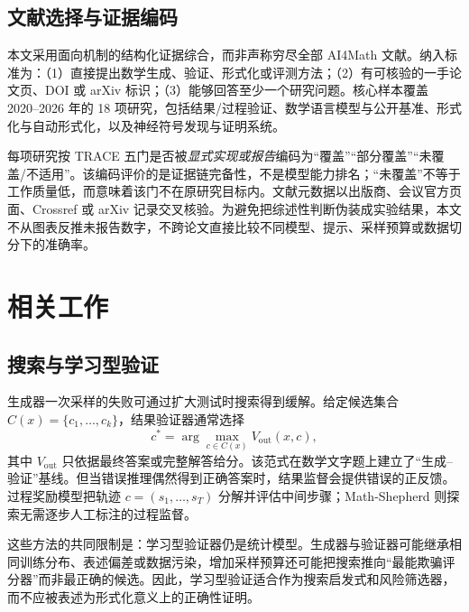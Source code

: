 \documentclass[UTF8,11pt,a4paper,fontset=fandol]{ctexart}
\newcommand{\trace}{\textsf{TRACE}}
\begin{document}
\subsection{文献选择与证据编码}
本文采用面向机制的结构化证据综合，而非声称穷尽全部 AI4Math 文献。纳入标准为：（1）直接提出数学生成、验证、形式化或评测方法；（2）有可核验的一手论文页、DOI 或 arXiv 标识；（3）能够回答至少一个研究问题。核心样本覆盖 2020--2026 年的 18 项研究，包括结果/过程验证\cite{cobbe2021verifiers,uesato2022feedback,lightman2024verify,wang2024mathshepherd}、数学语言模型与公开基准\cite{lewkowycz2022minerva,hendrycks2021math,he2024olympiadbench,glazer2024frontiermath}、形式化与自动形式化\cite{demoura2021lean4,mathlib2020,zheng2022minif2f,wu2022autoformalization,jiang2023draft,azerbayev2023proofnet,yang2023leandojo,poesia2023peano}，以及神经符号发现与证明系统\cite{trinh2024alphageometry,romeraparedes2024funsearch,hubert2026alphaproof}。

每项研究按 \trace{} 五门是否被\emph{显式实现或报告}编码为“覆盖”“部分覆盖”“未覆盖/不适用”。该编码评价的是证据链完备性，不是模型能力排名；“未覆盖”不等于工作质量低，而意味着该门不在原研究目标内。文献元数据以出版商、会议官方页面、Crossref 或 arXiv 记录交叉核验。为避免把综述性判断伪装成实验结果，本文不从图表反推未报告数字，不跨论文直接比较不同模型、提示、采样预算或数据切分下的准确率。

\section{相关工作}
\subsection{搜索与学习型验证}
生成器一次采样的失败可通过扩大测试时搜索得到缓解。给定候选集合 $C(x)=\{c_1,\ldots,c_k\}$，结果验证器通常选择
\begin{equation}
 c^*=\arg\max_{c\in C(x)} V_{\mathrm{out}}(x,c),
\end{equation}
其中 $V_{\mathrm{out}}$ 只依据最终答案或完整解答给分。该范式在数学文字题上建立了“生成--验证”基线\cite{cobbe2021verifiers}。但当错误推理偶然得到正确答案时，结果监督会提供错误的正反馈。过程奖励模型把轨迹 $c=(s_1,\ldots,s_T)$ 分解并评估中间步骤\cite{uesato2022feedback,lightman2024verify}；Math-Shepherd 则探索无需逐步人工标注的过程监督\cite{wang2024mathshepherd}。

这些方法的共同限制是：学习型验证器仍是统计模型。生成器与验证器可能继承相同训练分布、表述偏差或数据污染，增加采样预算还可能把搜索推向“最能欺骗评分器”而非最正确的候选。因此，学习型验证适合作为搜索启发式和风险筛选器，而不应被表述为形式化意义上的正确性证明。
\end{document}
